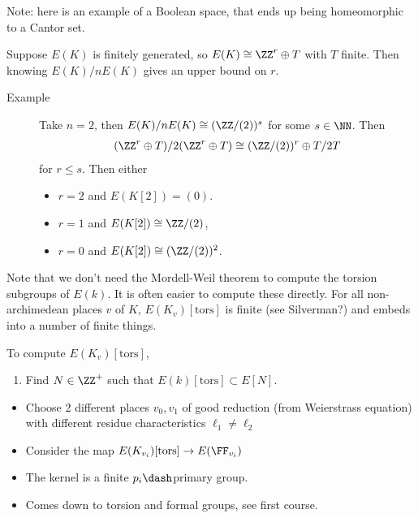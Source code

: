 Note: here is an example of a Boolean space, that ends up being
homeomorphic to a Cantor set.

Suppose \(E(K)\) is finitely generated, so \(E(K) \cong \ZZ^r \oplus T\)
with \(T\) finite. Then knowing \(E(K)/ n E(K)\) gives an upper bound on
\(r\).

\begin{description}
\item[Example]
Take \(n=2\), then \(E(K) / nE(K) \cong (\ZZ/(2))^s\) for some
\(s\in \NN\). Then
\begin{align*}
(\ZZ^r \oplus T) / 2(\ZZ^r \oplus T) \cong (\ZZ/(2))^r \oplus T/2T
\end{align*} for \(r\leq s\). Then either

\begin{itemize}
\tightlist
\item
  \(r = 2\) and \(E(K[2]) = (0)\).
\item
  \(r=1\) and \(E(K[2]) \cong \ZZ/(2)\),
\item
  \(r = 0\) and \(E(K[2]) \cong (\ZZ/(2))^2\).
\end{itemize}
\end{description}

Note that we don't need the Mordell-Weil theorem to compute the torsion
subgroups of \(E(k)\). It is often easier to compute these directly. For
all non-archimedean places \(v\) of \(K\), \(E(K_v)[\text{tors}]\) is
finite (see Silverman?) and embeds into a number of finite things.

To compute \(E(K_v)[\text{tors}]\),

\begin{enumerate}
\def\labelenumi{\arabic{enumi}.}
\tightlist
\item
  Find \(N \in \ZZ^+\) such that \(E(k)[\text{tors}] \subset E[N]\).
\end{enumerate}

\begin{itemize}
\item
  Choose 2 different places \(v_0, v_1\) of good reduction (from
  Weierstrass equation) with different residue characteristics
  \(\ell_1 \neq \ell_2\)
\item
  Consider the map \(E(K_{v_i})[\text{tors}] \to E(\FF_{v_i})\)
\item
  The kernel is a finite \(p_i\dash\)primary group.
\item
  Comes down to torsion and formal groups, see first course.
\end{itemize}

